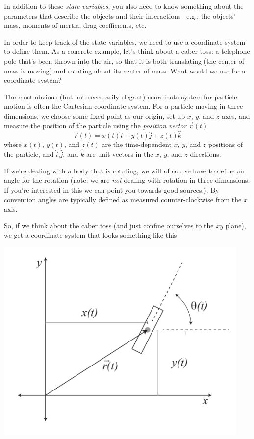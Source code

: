 In addition to these {\it state variables}, you also need to know something about the parameters that describe the objects and their interactions-- e.g., the objects' mass,  moments of inertia, drag coefficients, etc.

In order to keep track of the state variables, we need to use a coordinate system to define them.  As a concrete example, let's think about a caber toss: a telephone pole that's been thrown into the air, so that it is both translating (the center of mass is moving) and rotating about its center of mass.  What would we use for a coordinate system?

The most obvious (but not necessarily elegant) coordinate system for particle motion is often the Cartesian coordinate system.  For a particle moving in three dimensions, we choose some fixed point as our origin, set up $x$, $y$, and $z$ axes, and measure the position of the particle using the {\it position vector} $\vec{r}(t)$
$$\vec{r}(t) = x(t) \hat{i} + y(t) \hat{j} + z(t) \hat{k}$$
where $x(t)$, $y(t)$, and $z(t)$ are the time-dependent $x$, $y$, and $z$ positions of the particle, and $\hat{i}$,$\hat{j}$, and $\hat{k}$ are unit vectors in the  $x$, $y$, and $z$ directions.  


If we're dealing with a body that is rotating, we will of course have to define an angle for the rotation (note: we are {\it not} dealing with rotation in three dimensions.  If you're interested in this we can point you towards good sources.).  By convention angles are typically defined as measured counter-clockwise from the $x$ axis.

So, if we think about the caber toss (and just confine ourselves to the $xy$ plane), we get a coordinate system that looks something like this


\includegraphics[height=4in]{figs/ExampleCoordSystem}

